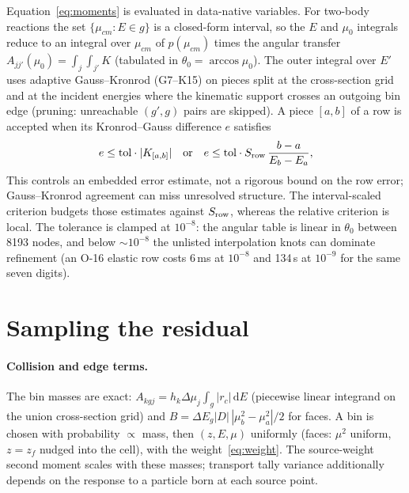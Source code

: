 \documentclass[11pt]{article}
\newcommand{\dd}{\,\mathrm{d}}
\begin{document}
Equation~\eqref{eq:moments} is evaluated in data-native variables. For two-body
reactions the set $\{\mu_{cm}:E\in g\}$ is a closed-form interval, so the $E$ and
$\mu_0$ integrals reduce to an integral over $\mu_{cm}$ of $p(\mu_{cm})$ times the
angular transfer $A_{jj'}(\mu_0)=\int_j\!\int_{j'}K$ (tabulated in
$\theta_0=\arccos\mu_0$). The outer integral over $E'$ uses adaptive Gauss--Kronrod
(G7--K15) on pieces split at the cross-section grid and at the incident energies where
the kinematic support crosses an outgoing bin edge (pruning: unreachable
$(g',g)$ pairs are skipped). A piece $[a,b]$ of a row is accepted when its
Kronrod--Gauss difference $e$ satisfies
\begin{equation}
  e\le \mathrm{tol}\cdot|K_{[a,b]}| \quad\text{or}\quad
  e\le \mathrm{tol}\cdot S_{\rm row}\,\frac{b-a}{E_b-E_a},
\end{equation}
This controls an embedded error estimate, not a rigorous bound on the row error;
Gauss--Kronrod agreement can miss unresolved structure. The interval-scaled criterion
budgets those estimates against $S_{\rm row}$, whereas the relative criterion is
local. The tolerance is clamped
at $10^{-8}$: the angular table is linear in $\theta_0$ between 8193 nodes, and below
$\sim10^{-8}$ the unlisted interpolation knots can dominate refinement (an O-16 elastic row costs 6\,ms at
$10^{-8}$ and 134\,s at $10^{-9}$ for the same seven digits).

\section{Sampling the residual}

\paragraph{Collision and edge terms.} The bin masses are exact:
$A_{kgj}=h_k\Delta\mu_j\int_g|r_c|\dd E$ (piecewise linear integrand on the union
cross-section grid) and $B=\Delta E_g|D|\,|\mu_b^2-\mu_a^2|/2$ for faces. A bin is
chosen with probability $\propto$ mass, then $(z,E,\mu)$ uniformly (faces: $\mu^2$
uniform, $z=z_f$ nudged into the cell), with the weight~\eqref{eq:weight}. The
source-weight second moment scales with these masses; transport tally variance
additionally depends on the response to a particle born at each source point.
\end{document}
